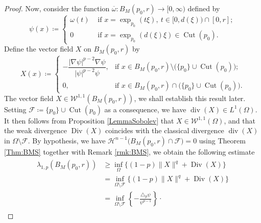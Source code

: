 \documentclass{article}
\begin{document}
\begin{proof}
Now, consider the function $\overline{\omega} \colon B_M(p_0,r) \to [0,\infty)$ defined by
\begin{equation}\label{modelfunction}
\psi(x) \coloneq \left\{\begin{array}{cl}
\omega(t) & \text { if } x=\exp_{p_0}(t \xi), \ t \in[0, d(\xi)) \cap[0, r]; \\
0 & \text { if } x=\exp_{p_0}(d(\xi)\xi) \in \operatorname{Cut}(p_0).
\end{array}\right.
\end{equation}
Define the vector field $X$ on $B_M(p_0,r)$ by
\begin{equation}\label{Field}
X(x) \coloneq
\begin{cases}
- \dfrac{|\nabla \psi|^{p-2}\nabla\psi}{|\psi|^{p-2}\psi}, 
& \text{if } x\in B_M(p_0,r)\setminus\big(\{p_0\}\cup \operatorname{Cut}(p_0)\big); \\
0,
& \text{if } x\in B_M(p_0,r)\cap\big(\{p_0\}\cup \operatorname{Cut}(p_0)\big).
\end{cases}
\end{equation}
The vector field $X \in \mathcal{W}^{1,1}(B_M(p_0,r))$, we shall establish this result later. Setting $\mathcal{F} \coloneq \{p_0\}\cup \operatorname{Cut}(p_0)$ as a consequence, we have $\operatorname{div}(X) \in L^{1}(\Omega)$. It then follows from Proposition \ref{LemmaSobolev} that $X \in \mathcal{W}^{1,1}(\Omega)$, and that the weak divergence $\operatorname{Div}(X)$ coincides with the classical divergence $\operatorname{div}(X)$ in $\Omega \setminus \mathcal{F}$. By hypothesis, we have $\mathcal{H}^{n-1}\bigl( B_M(p_0,r) \cap \mathcal{F} \bigr)=0$
using Theorem \ref{Thm:BMS} together with Remark \ref{rmk:BMS}, we obtain the following estimate
\begin{eqnarray}\label{Newton-Montenegro-Barnabé}
\begin{aligned}
    \lambda_{1,p}(B_M(p_0,r)) &\geq \inf_{\Omega} \{ (1-p)\|X\|^q+\operatorname{Div}(X) \} \\
    &= \inf_{\Omega \setminus \mathcal{F}} \{ (1-p)\|X\|^q+\operatorname{Div}(X) \} \\
    &= \inf_{\Omega \setminus \mathcal{F}} \left\{ -\frac{\triangle_p \psi}{\psi^{p-1}} \right\}\cdot
    \end{aligned}
\end{eqnarray}


\end{proof}
\end{document}
